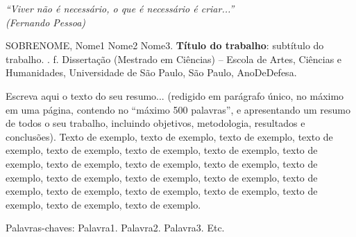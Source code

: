 \documentclass[
	12pt,				%
	oneside,			%
	a4paper,			%
	english,			%
	brazil				%
	]{abntex2ppgsi}
\begin{document}
%
% 
\begin{epigrafe}
    \vspace*{\fill}
	\begin{flushright}
		\textit{``Viver não é necessário, o que é necessário é criar...''\\
		(Fernando Pessoa)}
	\end{flushright}
\end{epigrafe}


\setlength{\absparsep}{18pt} %
\begin{resumo}

% 
%
% 
%
\begin{flushleft}
SOBRENOME, Nome1 Nome2 Nome3. \textbf{Título do trabalho}: subtítulo do trabalho. \imprimirdata. \pageref{LastPage} f. Dissertação (Mestrado em Ciências) – Escola de Artes, Ciências e Humanidades, Universidade de São Paulo, São Paulo, AnoDeDefesa.
\end{flushleft}

Escreva aqui o texto do seu resumo... (redigido em parágrafo único, no máximo em uma página, contendo no ``máximo 500 palavras'', e apresentando um resumo de todos o seu trabalho, incluindo objetivos, metodologia, resultados e conclusões). Texto de exemplo, texto de exemplo, texto de exemplo, texto de exemplo, texto de exemplo, texto de exemplo, texto de exemplo, texto de exemplo, texto de exemplo, texto de exemplo, texto de exemplo, texto de exemplo, texto de exemplo, texto de exemplo, texto de exemplo, texto de exemplo, texto de exemplo, texto de exemplo, texto de exemplo, texto de exemplo, texto de exemplo, texto de exemplo.

Palavras-chaves: Palavra1. Palavra2. Palavra3. Etc.
\end{resumo}
\end{document}
